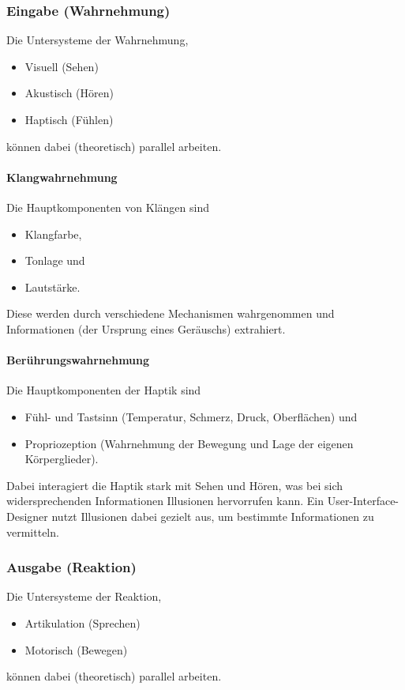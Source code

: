 			\subsubsection{Eingabe (Wahrnehmung)}
				Die Untersysteme der Wahrnehmung,
				\begin{itemize}
					\item Visuell (Sehen)
					\item Akustisch (Hören)
					\item Haptisch (Fühlen)
				\end{itemize}
				können dabei (theoretisch) parallel arbeiten.
			
				\paragraph{Klangwahrnehmung}
					Die Hauptkomponenten von Klängen sind
					\begin{itemize}
						\item Klangfarbe,
						\item Tonlage und
						\item Lautstärke.
					\end{itemize}
					Diese werden durch verschiedene Mechanismen wahrgenommen und Informationen (\zB der Ursprung eines Geräuschs) extrahiert.

				\paragraph{Berührungswahrnehmung}
					Die Hauptkomponenten der Haptik sind
					\begin{itemize}
						\item Fühl- und Tastsinn (Temperatur, Schmerz, Druck, Oberflächen) und
						\item Propriozeption (Wahrnehmung der Bewegung und Lage der eigenen Körperglieder).
					\end{itemize}
					Dabei interagiert die Haptik stark mit Sehen und Hören, was bei sich widersprechenden Informationen Illusionen hervorrufen kann. Ein User-Interface-Designer nutzt Illusionen dabei gezielt aus, um bestimmte Informationen zu vermitteln.

			\subsubsection{Ausgabe (Reaktion)}
				Die Untersysteme der Reaktion,
				\begin{itemize}
					\item Artikulation (Sprechen)
					\item Motorisch (Bewegen)
				\end{itemize}
				können dabei (theoretisch) parallel arbeiten.
				

